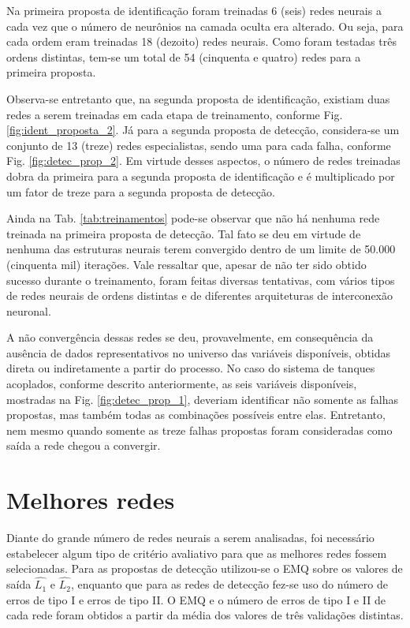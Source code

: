 Na primeira proposta de identificação foram treinadas 6 (seis) redes neurais a
cada vez que o número de neurônios na camada oculta era alterado. Ou seja, para
cada ordem eram treinadas 18 (dezoito) redes neurais. Como foram testadas três
ordens distintas, tem-se um total de 54 (cinquenta e quatro) redes para a
primeira proposta.

Observa-se entretanto que, na segunda proposta de identificação, existiam duas
redes a serem treinadas em cada etapa de treinamento, conforme Fig.
\ref{fig:ident_proposta_2}. Já para a segunda proposta de detecção, considera-se
um conjunto de 13 (treze) redes especialistas, sendo uma para cada falha,
conforme Fig. \ref{fig:detec_prop_2}. Em virtude desses aspectos, o número de
redes treinadas dobra da primeira para a segunda proposta de identificação e é
multiplicado por um fator de treze para a segunda proposta de detecção.

Ainda na Tab. \ref{tab:treinamentos} pode-se observar que não há nenhuma rede
treinada na primeira proposta de detecção. Tal fato se deu em virtude de nenhuma
das estruturas neurais terem convergido dentro de um limite de 50.000 (cinquenta
mil) iterações. Vale ressaltar que, apesar de não ter sido obtido sucesso
durante o treinamento, foram feitas diversas tentativas, com vários tipos de
redes neurais de ordens distintas e de diferentes arquiteturas de interconexão
neuronal. 

A não convergência dessas redes se deu, provavelmente, em consequência da
ausência de dados representativos no universo das variáveis disponíveis, obtidas
direta ou indiretamente a partir do processo. No caso do sistema de tanques
acoplados, conforme descrito anteriormente, as seis variáveis disponíveis,
mostradas na Fig. \ref{fig:detec_prop_1}, deveriam identificar não somente as
falhas propostas, mas também todas as combinações possíveis entre elas.
Entretanto, nem mesmo quando somente as treze falhas propostas foram
consideradas como saída a rede chegou a convergir.

\section{Melhores redes}
Diante do grande número de redes neurais a serem analisadas, foi necessário
estabelecer algum tipo de critério avaliativo para que as melhores redes fossem
selecionadas. Para as propostas de detecção utilizou-se o EMQ sobre os valores
de saída $\widehat{L_1}$ e $\widehat{L_2}$, enquanto que para as redes de
detecção fez-se uso do número de erros de tipo I e erros de tipo II.  O EMQ e o
número de erros de tipo I e II de cada rede foram obtidos a partir da média dos
valores de três validações distintas.

